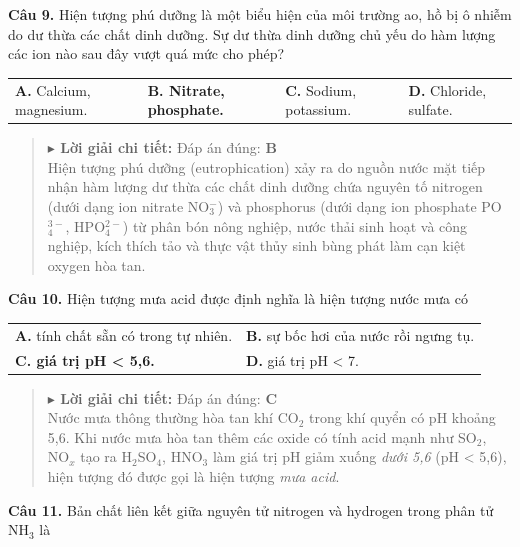 \documentclass[11pt,a4paper]{article}
\begin{document}
\textbf{Câu 9.} Hiện tượng phú dưỡng là một biểu hiện của môi trường ao, hồ bị ô nhiễm do dư thừa các chất dinh dưỡng. Sự dư thừa dinh dưỡng chủ yếu do hàm lượng các ion nào sau đây vượt quá mức cho phép?

\begin{tabularx}{\textwidth}{@{}XXXX@{}}
\textbf{A.} Calcium, magnesium. & \textbf{\color{red} B. Nitrate, phosphate.} & \textbf{C.} Sodium, potassium. & \textbf{D.} Chloride, sulfate. \\
\end{tabularx}

\begin{quote}\small
{\color{myBlue}\textbf{$\blacktriangleright$ Lời giải chi tiết:}} Đáp án đúng: \textbf{\color{red} B}\\
Hiện tượng phú dưỡng (eutrophication) xảy ra do nguồn nước mặt tiếp nhận hàm lượng dư thừa các chất dinh dưỡng chứa nguyên tố nitrogen (dưới dạng ion nitrate NO$_{3}^{-}$) và phosphorus (dưới dạng ion phosphate PO$_{4}^{3-}$, HPO$_{4}^{2-}$) từ phân bón nông nghiệp, nước thải sinh hoạt và công nghiệp, kích thích tảo và thực vật thủy sinh bùng phát làm cạn kiệt oxygen hòa tan.
\end{quote}
\vspace{2pt}

\textbf{Câu 10.} Hiện tượng mưa acid được định nghĩa là hiện tượng nước mưa có

\begin{tabularx}{\textwidth}{@{}XX@{}}
\textbf{A.} tính chất sẵn có trong tự nhiên. & \textbf{B.} sự bốc hơi của nước rồi ngưng tụ. \\
\textbf{\color{red} C. giá trị pH < 5,6.} & \textbf{D.} giá trị pH < 7. \\
\end{tabularx}

\begin{quote}\small
{\color{myBlue}\textbf{$\blacktriangleright$ Lời giải chi tiết:}} Đáp án đúng: \textbf{\color{red} C}\\
Nước mưa thông thường hòa tan khí CO$_{2}$ trong khí quyển có pH khoảng 5,6. Khi nước mưa hòa tan thêm các oxide có tính acid mạnh như SO$_{2}$, NO$_{x}$ tạo ra H$_{2}$SO$_{4}$, HNO$_{3}$ làm giá trị pH giảm xuống \textit{dưới 5,6} (pH < 5,6), hiện tượng đó được gọi là hiện tượng \textit{mưa acid}.
\end{quote}
\vspace{2pt}

\textbf{Câu 11.} Bản chất liên kết giữa nguyên tử nitrogen và hydrogen trong phân tử NH$_{3}$ là
\end{document}
